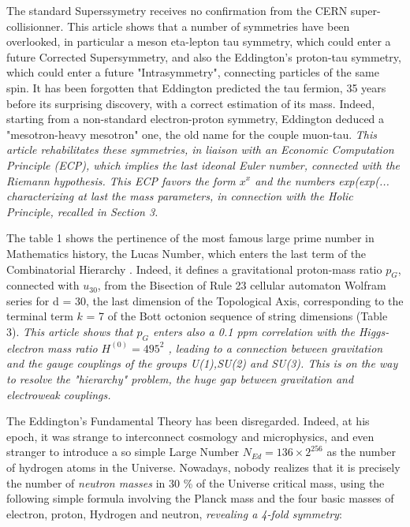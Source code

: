 \documentclass[a4paper,9pt]{article}
\newcounter{row}
\newcounter{col}
\begin{document}
The standard Superssymetry receives no confirmation from the CERN super-collisionner. This article shows that a number of symmetries have been overlooked, in particular a meson eta-lepton tau symmetry, which could enter a future Corrected Supersymmetry, and also the Eddington's proton-tau symmetry, which could enter a future "Intrasymmetry", connecting particles of the same spin. It has been forgotten that Eddington predicted the tau fermion, 35 years before its surprising discovery, with a correct estimation of its mass. Indeed, starting from a non-standard electron-proton symmetry, Eddington deduced a "mesotron-heavy mesotron" one, the old name for the couple muon-tau. \textit{This article rehabilitates these symmetries, in liaison with an Economic Computation Principle (ECP), which implies the last ideonal Euler number, connected with the Riemann hypothesis. This ECP favors the form $x^x$ and the numbers exp(exp(... characterizing at last the mass parameters, in connection with the Holic Principle, recalled in Section 3.} 

The table 1 shows the pertinence of the most famous large prime number in Mathematics history, the Lucas Number, which enters the last term of the Combinatorial Hierarchy \cite{Bastin} \cite{Noyes}. Indeed, it defines a gravitational proton-mass ratio $p_G$, connected with $u_{30}$, from the Bisection of Rule 23 cellular automaton Wolfram series \cite{tHooft} for d = 30, the last dimension of the Topological Axis, corresponding to the terminal term $k$ = 7 of the Bott octonion sequence of string dimensions (Table 3). \textit {This article shows that $p_G$ enters also a 0.1 ppm correlation with the Higgs-electron mass ratio $ H^{(0)}= 495^2$ \cite{Sanchez2}, leading to a connection between gravitation and the gauge couplings of the groups U(1),SU(2) and SU(3). This is on the way to resolve the "hierarchy" problem, the huge gap between gravitation and electroweak couplings.} 

The Eddington's Fundamental Theory \cite{Eddington} has been disregarded. Indeed, at his epoch, it was strange to interconnect cosmology and microphysics, and even stranger to introduce a so simple Large Number $ N_{Ed} = 136 \times 2^{256}$ as the number of hydrogen atoms in the Universe. Nowadays, nobody realizes that it is precisely the number of \textit{neutron masses} in 30 \% of the Universe critical mass, using the following simple formula involving the Planck mass and the four basic masses of electron, proton, Hydrogen and neutron, \textit{revealing a 4-fold symmetry}: 
\end{document}
